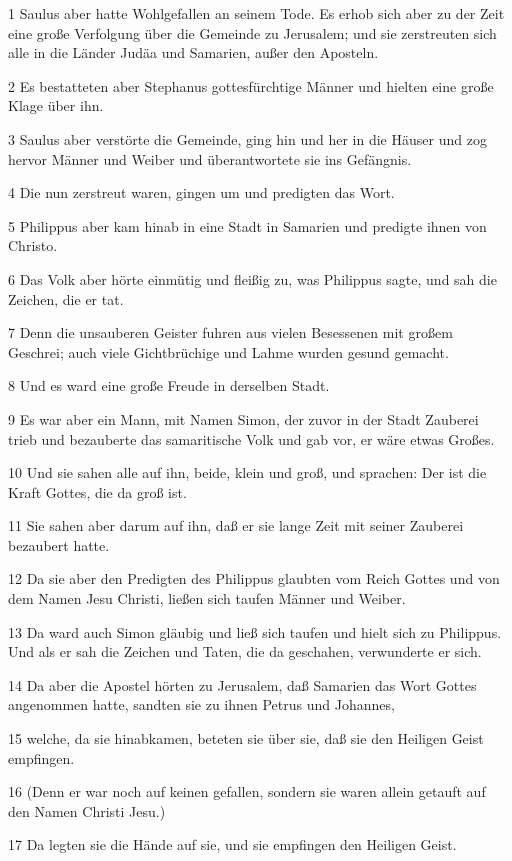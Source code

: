 \par 1 Saulus aber hatte Wohlgefallen an seinem Tode. Es erhob sich aber zu der Zeit eine große Verfolgung über die Gemeinde zu Jerusalem; und sie zerstreuten sich alle in die Länder Judäa und Samarien, außer den Aposteln.
\par 2 Es bestatteten aber Stephanus gottesfürchtige Männer und hielten eine große Klage über ihn.
\par 3 Saulus aber verstörte die Gemeinde, ging hin und her in die Häuser und zog hervor Männer und Weiber und überantwortete sie ins Gefängnis.
\par 4 Die nun zerstreut waren, gingen um und predigten das Wort.
\par 5 Philippus aber kam hinab in eine Stadt in Samarien und predigte ihnen von Christo.
\par 6 Das Volk aber hörte einmütig und fleißig zu, was Philippus sagte, und sah die Zeichen, die er tat.
\par 7 Denn die unsauberen Geister fuhren aus vielen Besessenen mit großem Geschrei; auch viele Gichtbrüchige und Lahme wurden gesund gemacht.
\par 8 Und es ward eine große Freude in derselben Stadt.
\par 9 Es war aber ein Mann, mit Namen Simon, der zuvor in der Stadt Zauberei trieb und bezauberte das samaritische Volk und gab vor, er wäre etwas Großes.
\par 10 Und sie sahen alle auf ihn, beide, klein und groß, und sprachen: Der ist die Kraft Gottes, die da groß ist.
\par 11 Sie sahen aber darum auf ihn, daß er sie lange Zeit mit seiner Zauberei bezaubert hatte.
\par 12 Da sie aber den Predigten des Philippus glaubten vom Reich Gottes und von dem Namen Jesu Christi, ließen sich taufen Männer und Weiber.
\par 13 Da ward auch Simon gläubig und ließ sich taufen und hielt sich zu Philippus. Und als er sah die Zeichen und Taten, die da geschahen, verwunderte er sich.
\par 14 Da aber die Apostel hörten zu Jerusalem, daß Samarien das Wort Gottes angenommen hatte, sandten sie zu ihnen Petrus und Johannes,
\par 15 welche, da sie hinabkamen, beteten sie über sie, daß sie den Heiligen Geist empfingen.
\par 16 (Denn er war noch auf keinen gefallen, sondern sie waren allein getauft auf den Namen Christi Jesu.)
\par 17 Da legten sie die Hände auf sie, und sie empfingen den Heiligen Geist.
